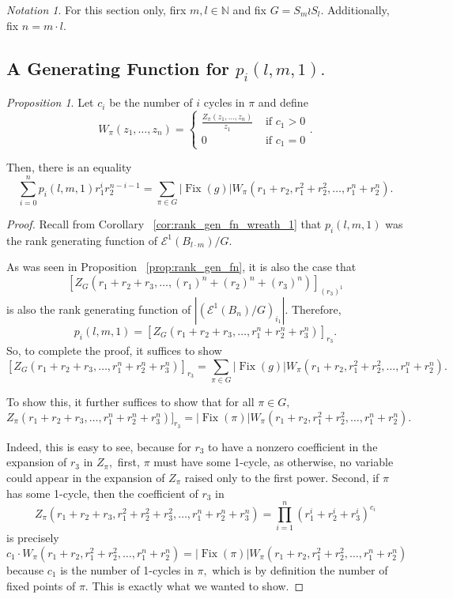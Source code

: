 \documentclass[10 pt]{amsart}
\theoremstyle{plain}
\theoremstyle{definition}
\theoremstyle{remark}
\numberwithin{equation}{section}
\newtheorem{prop}[thm]{Proposition}
\theoremstyle{remark}
\newtheorem{note}[thm]{Notation}
\newcommand\ssec{\subsection}
\newcommand\BN{{\mathbb N}}
\def\Fix{\operatorname{Fix}}
\begin{document}
\begin{note}
For this section only, firx $m,l \in \BN$ and fix $G = S_m \wr S_l.$ Additionally, fix $n = m \cdot l.$
\end{note}

\ssec{A Generating Function for $p_i(l,m,1).$}

\begin{prop}
Let $c_i$ be the number of $i$ cycles in $\pi$ and define $$W_\pi(z_1,\ldots, z_n) = \begin{cases}\frac {Z_\pi(z_1,\ldots,z_n)}{z_1} &\text{ if } c_1 > 0 \\
0 &\text{ if } c_1 = 0
\end{cases}.$$

Then, there is an equality
$$\sum_{i=0}^n p_i(l,m,1) r_1^ir_2^{n-i-1} = \sum_{\pi \in G} |\Fix(g)|W_\pi(r_1 + r_2,r_1^2+r_2^2,\ldots,r_1^n + r_2^n).$$
\end{prop}
\begin{proof}
Recall from Corollary ~\ref{cor:rank_gen_fn_wreath_1} that $p_i(l,m,1)$ was the rank generating function of $\mathcal E^1(B_{l\cdot m})/G$. 

As was seen in Proposition ~\ref{prop:rank_gen_fn}, it is also the case that $$[Z_G(r_1+r_2+r_3,\ldots, (r_1)^n+(r_2)^n+(r_3)^n)]_{(r_3)^1}$$ is also the rank generating function of $|(\mathcal E^{1}(B_n)/G)_{i_1}|.$
Therefore, 
$$p_i(l,m,1)=[Z_G(r_1+r_2 + r_3,\ldots, r_1^n+ r_2^n + r_3^n)]_{r_3}.$$
So, to complete the proof, it suffices to show 
$$[Z_G(r_1+r_2 + r_3,\ldots, r_1^n+ r_2^n + r_3^n)]_{r_3} = \sum_{\pi \in G} |\Fix(g)|W_\pi(r_1 + r_2,r_1^2+r_2^2,\ldots,r_1^n + r_2^n).$$

To show this, it further suffices to show that for all $\pi \in G,$
$$Z_\pi(r_1+r_2 + r_3,\ldots, r_1^n+ r_2^n + r_3^n)]_{r_3} =  |\Fix(\pi)|W_\pi(r_1 + r_2,r_1^2+r_2^2,\ldots,r_1^n + r_2^n).$$

Indeed, this is easy to see, because for $r_3$ to have a nonzero coefficient in the expansion of $r_3$ in $Z_\pi,$ first, $\pi$ must have some 1-cycle, as otherwise, no variable could appear in the expansion of $Z_\pi$ raised only to the first power. Second, if $\pi$ has some 1-cycle, then the coefficient of $r_3$ in $$Z_\pi(r_1 + r_2+r_3,r_1^2+r_2^2+r_3^2,\ldots,r_1^n + r_2^n+r_3^n) = \prod_{i=1}^n (r_1^i+r_2^i+r_3^i)^{c_i}$$ is precisely 
$$c_1 \cdot W_\pi(r_1 + r_2,r_1^2+r_2^2,\ldots,r_1^n + r_2^n) = |\Fix(\pi)|W_\pi(r_1 + r_2,r_1^2+r_2^2,\ldots,r_1^n + r_2^n)$$ because $c_1$ is the number of 1-cycles in $\pi,$ which is by definition the number of fixed points of $\pi.$ This is exactly what we wanted to show.
\end{proof}
\end{document}
